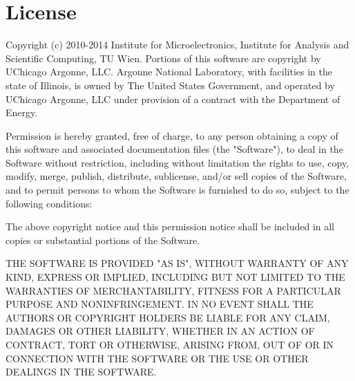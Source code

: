 
\chapter{License} %

Copyright (c) 2010-2014 Institute for Microelectronics, Institute for Analysis and Scientific Computing, TU Wien.
Portions of this software are copyright by UChicago Argonne, LLC.
Argonne National Laboratory, with facilities in the state of Illinois,
is owned by The United States Government, and operated by UChicago Argonne, LLC
under provision of a contract with the Department of Energy.

Permission is hereby granted, free of charge, to any person obtaining a copy
of this software and associated documentation files (the "Software"), to deal
in the Software without restriction, including without limitation the rights
to use, copy, modify, merge, publish, distribute, sublicense, and/or sell
copies of the Software, and to permit persons to whom the Software is
furnished to do so, subject to the following conditions:

The above copyright notice and this permission notice shall be included in
all copies or substantial portions of the Software.

THE SOFTWARE IS PROVIDED "AS IS", WITHOUT WARRANTY OF ANY KIND, EXPRESS OR
IMPLIED, INCLUDING BUT NOT LIMITED TO THE WARRANTIES OF MERCHANTABILITY,
FITNESS FOR A PARTICULAR PURPOSE AND NONINFRINGEMENT. IN NO EVENT SHALL THE
AUTHORS OR COPYRIGHT HOLDERS BE LIABLE FOR ANY CLAIM, DAMAGES OR OTHER
LIABILITY, WHETHER IN AN ACTION OF CONTRACT, TORT OR OTHERWISE, ARISING FROM,
OUT OF OR IN CONNECTION WITH THE SOFTWARE OR THE USE OR OTHER DEALINGS IN
THE SOFTWARE.

